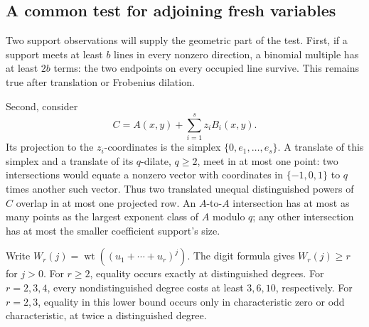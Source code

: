 \documentclass[11pt]{article}
\DeclareMathOperator{\wt}{wt}\DeclareMathOperator{\ord}{ord}
\numberwithin{equation}{section}
\theoremstyle{definition}\newtheorem{definition}[theorem]{Definition}
\theoremstyle{remark}\newtheorem{remark}[theorem]{Remark}
\begin{document}
\subsection{A common test for adjoining fresh variables}

Two support observations will supply the geometric part of the test.
First, if a support meets at least $b$ lines in every nonzero direction,
a binomial multiple has at least $2b$ terms: the two endpoints on every
occupied line survive. This remains true after translation or Frobenius
dilation.

Second, consider
\begin{equation}\label{eq:initial-sliced-support}
 C=A(x,y)+\sum_{i=1}^s z_iB_i(x,y).
\end{equation}
Its projection to the $z_i$-coordinates is the simplex
$\{0,e_1,\ldots,e_s\}$. A translate of this simplex and a translate
of its $q$-dilate, $q\ge2$, meet in at most one point: two intersections
would equate a nonzero vector with coordinates in $\{-1,0,1\}$ to $q$
times another such vector. Thus two translated unequal distinguished
powers of $C$ overlap in at most one projected row. An $A$-to-$A$
intersection has at most as many points as the largest exponent class
of $A$ modulo $q$; any other intersection has at most the smaller
coefficient support's size.

Write $W_r(j)=\wt((u_1+\cdots+u_r)^j)$. The digit formula gives
$W_r(j)\ge r$ for $j>0$. For $r\ge2$, equality occurs exactly at
distinguished degrees. For $r=2,3,4$, every nondistinguished degree
costs at least $3,6,10$, respectively. For $r=2,3$, equality in
this lower bound occurs only in characteristic zero or odd
characteristic, at twice a distinguished degree.
\end{document}

